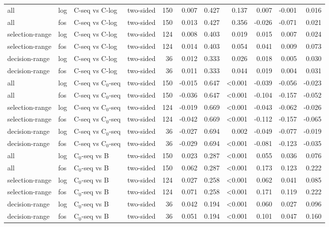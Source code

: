 \begin{longtable}{llllrrrrrrr}
all & log & C-seq vs C-log & two-sided & 150 & 0.007 & 0.427 & 0.137 & 0.007 & -0.001 & 0.016 \\
all & fos & C-seq vs C-log & two-sided & 150 & 0.013 & 0.427 & 0.356 & -0.026 & -0.071 & 0.021 \\
selection-range & log & C-seq vs C-log & two-sided & 124 & 0.008 & 0.403 & 0.019 & 0.015 & 0.007 & 0.024 \\
selection-range & fos & C-seq vs C-log & two-sided & 124 & 0.014 & 0.403 & 0.054 & 0.041 & 0.009 & 0.073 \\
decision-range & log & C-seq vs C-log & two-sided & 36 & 0.012 & 0.333 & 0.026 & 0.018 & 0.005 & 0.030 \\
decision-range & fos & C-seq vs C-log & two-sided & 36 & 0.011 & 0.333 & 0.044 & 0.019 & 0.004 & 0.031 \\
all & log & C-seq vs C$_0$-seq & two-sided & 150 & -0.015 & 0.647 & <0.001 & -0.039 & -0.056 & -0.023 \\
all & fos & C-seq vs C$_0$-seq & two-sided & 150 & -0.036 & 0.647 & <0.001 & -0.104 & -0.157 & -0.052 \\
selection-range & log & C-seq vs C$_0$-seq & two-sided & 124 & -0.019 & 0.669 & <0.001 & -0.043 & -0.062 & -0.026 \\
selection-range & fos & C-seq vs C$_0$-seq & two-sided & 124 & -0.042 & 0.669 & <0.001 & -0.112 & -0.157 & -0.065 \\
decision-range & log & C-seq vs C$_0$-seq & two-sided & 36 & -0.027 & 0.694 & 0.002 & -0.049 & -0.077 & -0.019 \\
decision-range & fos & C-seq vs C$_0$-seq & two-sided & 36 & -0.029 & 0.694 & <0.001 & -0.081 & -0.123 & -0.035 \\
all & log & C$_0$-seq vs B & two-sided & 150 & 0.023 & 0.287 & <0.001 & 0.055 & 0.036 & 0.076 \\
all & fos & C$_0$-seq vs B & two-sided & 150 & 0.062 & 0.287 & <0.001 & 0.173 & 0.123 & 0.222 \\
selection-range & log & C$_0$-seq vs B & two-sided & 124 & 0.027 & 0.258 & <0.001 & 0.062 & 0.041 & 0.085 \\
selection-range & fos & C$_0$-seq vs B & two-sided & 124 & 0.071 & 0.258 & <0.001 & 0.171 & 0.119 & 0.222 \\
decision-range & log & C$_0$-seq vs B & two-sided & 36 & 0.042 & 0.194 & <0.001 & 0.060 & 0.027 & 0.096 \\
decision-range & fos & C$_0$-seq vs B & two-sided & 36 & 0.051 & 0.194 & <0.001 & 0.101 & 0.047 & 0.160 \\

\end{longtable}
